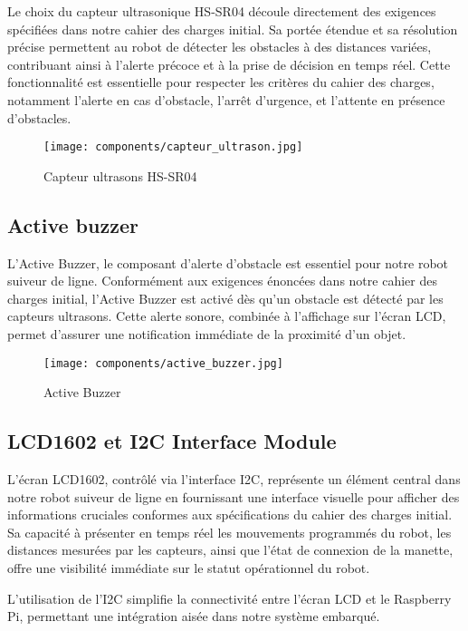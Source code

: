 Le choix du capteur ultrasonique HS-SR04 découle directement des exigences spécifiées dans notre cahier des charges initial. Sa portée étendue et sa résolution précise permettent au robot de détecter les obstacles à des distances variées, contribuant ainsi à l'alerte précoce et à la prise de décision en temps réel. Cette fonctionnalité est essentielle pour respecter les critères du cahier des charges, notamment l'alerte en cas d'obstacle, l'arrêt d'urgence, et l'attente en présence d'obstacles.

\begin{figure}[h]
    \centering
    \texttt{[image: components/capteur\_ultrason.jpg]}
    \caption{Capteur ultrasons HS-SR04}
    \label{fig:HS-SR04}
\end{figure}

\subsection{Active buzzer}
L'Active Buzzer, le composant d'alerte d'obstacle est essentiel pour notre robot suiveur de ligne. Conformément aux exigences énoncées dans notre cahier des charges initial, l'Active Buzzer est activé dès qu'un obstacle est détecté par les capteurs ultrasons. Cette alerte sonore, combinée à l'affichage sur l'écran LCD, permet d'assurer une notification immédiate de la proximité d'un objet.

\begin{figure}[h]
    \centering
    \texttt{[image: components/active\_buzzer.jpg]}
    \caption{Active Buzzer}
    \label{fig:Active Buzzer}
\end{figure}

\subsection{LCD1602 et I2C Interface Module}
L'écran LCD1602, contrôlé via l'interface I2C, représente un élément central dans notre robot suiveur de ligne en fournissant une interface visuelle pour afficher des informations cruciales conformes aux spécifications du cahier des charges initial. Sa capacité à présenter en temps réel les mouvements programmés du robot, les distances mesurées par les capteurs, ainsi que l'état de connexion de la manette, offre une visibilité immédiate sur le statut opérationnel du robot.

L'utilisation de l'I2C simplifie la connectivité entre l'écran LCD et le Raspberry Pi, permettant une intégration aisée dans notre système embarqué.

